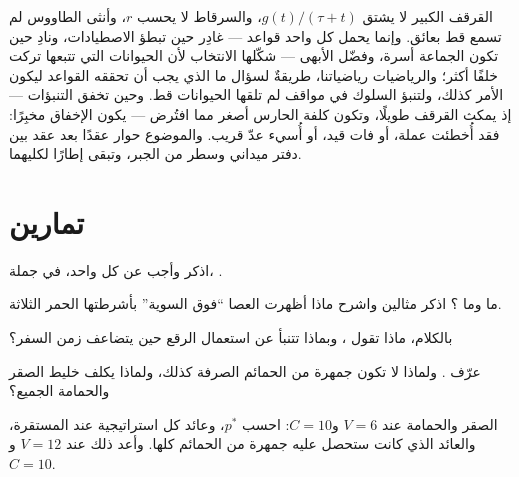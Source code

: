 \begin{remark}\label{rem:b3:behavioural-ecology:remark}
القرقف الكبير لا يشتق $g(t)/(\tau + t)$، والسرقاط لا يحسب
$r$، وأنثى الطاووس لم تسمع قط بعائق. وإنما يحمل كل واحد
قواعد --- غادِر حين تبطؤ الاصطيادات، ونادِ حين تكون الجماعة
أسرة، وفضّل الأبهى --- شكّلها الانتخاب لأن
الحيوانات التي تتبعها تركت خلفًا أكثر؛ والرياضيات رياضياتنا،
طريقةٌ لسؤال ما الذي يجب أن تحققه القواعد ليكون الأمر كذلك،
ولتنبؤ السلوك في مواقف لم تلقها الحيوانات قط. وحين تخفق
التنبؤات --- إذ يمكث القرقف طويلًا، وتكون كلفة الحارس
أصغر مما افتُرض --- يكون الإخفاق مخبِرًا: فقد أُخطئت عملة، أو
فات قيد، أو أُسيء عدّ قريب. والموضوع
حوار عقدًا بعد عقد بين دفتر ميداني
وسطر من الجبر، وتبقى 
إطارًا لكليهما.
\end{remark}

\section{تمارين}

\begin{exercise}[$\star$]\label{exo:b3:behavioural-ecology:1}
اذكر  وأجب عن كل واحد، في جملة، .
\end{exercise}

\begin{exercise}[$\star$]\label{exo:b3:behavioural-ecology:2}
ما  وما ؟ اذكر مثالين واشرح
ماذا أظهرت العصا ``فوق السوية'' بأشرطتها الحمر الثلاثة.
\end{exercise}

\begin{exercise}[$\star$]\label{exo:b3:behavioural-ecology:3}
بالكلام، ماذا تقول ، وبماذا تتنبأ عن
استعمال الرقع حين يتضاعف زمن السفر؟
\end{exercise}

\begin{exercise}[$\star$]\label{exo:b3:behavioural-ecology:4}
عرّف . ولماذا لا تكون جمهرة من
الحمائم الصرفة كذلك، ولماذا يكلف خليط الصقر والحمامة الجميع؟
\end{exercise}

\begin{exercise}[$\star\star$]\label{exo:b3:behavioural-ecology:5}
الصقر والحمامة عند $V = 6$ و$C = 10$: احسب $p^{*}$، وعائد كل
استراتيجية عند المستقرة، والعائد الذي كانت ستحصل عليه جمهرة
من الحمائم كلها. وأعد ذلك عند $V = 12$ و$C = 10$.
\end{exercise}

